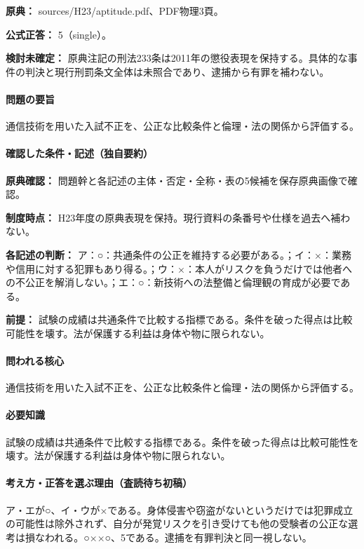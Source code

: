 \noindent\textbf{原典：} sources/H23/aptitude.pdf、PDF物理3頁。

\textbf{公式正答：} 5（single）。

\par\textbf{検討未確定：} 原典注記の刑法233条は2011年の懲役表現を保持する。具体的な事件の判決と現行刑罰条文全体は未照合であり、逮捕から有罪を補わない。

\paragraph{問題の要旨} 通信技術を用いた入試不正を、公正な比較条件と倫理・法の関係から評価する。

\paragraph{確認した条件・記述（独自要約）}\mbox{}\par

\noindent\textbf{原典確認：} 問題幹と各記述の主体・否定・全称・表の5候補を保存原典画像で確認。\par

\noindent\textbf{制度時点：} H23年度の原典表現を保持。現行資料の条番号や仕様を過去へ補わない。\par

\noindent\textbf{各記述の判断：} ア：○：共通条件の公正を維持する必要がある。；イ：×：業務や信用に対する犯罪もあり得る。；ウ：×：本人がリスクを負うだけでは他者への不公正を解消しない。；エ：○：新技術への法整備と倫理観の育成が必要である。\par

\noindent\textbf{前提：} 試験の成績は共通条件で比較する指標である。条件を破った得点は比較可能性を壊す。法が保護する利益は身体や物に限られない。\par

\paragraph{問われる核心} 通信技術を用いた入試不正を、公正な比較条件と倫理・法の関係から評価する。

\paragraph{必要知識} 試験の成績は共通条件で比較する指標である。条件を破った得点は比較可能性を壊す。法が保護する利益は身体や物に限られない。

\paragraph{考え方・正答を選ぶ理由（査読待ち初稿）} ア・エが○、イ・ウが×である。身体侵害や窃盗がないというだけでは犯罪成立の可能性は除外されず、自分が発覚リスクを引き受けても他の受験者の公正な選考は損なわれる。○××○、5である。逮捕を有罪判決と同一視しない。


